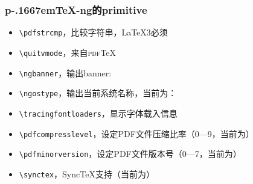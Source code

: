 \documentclass[dvipdfmx]{beamer}
\newcommand{\pTeX}{p\kern-.1667em\TeX}
\newcommand{\ptexng}{\pTeX-ng}
\begin{document}
%
\begin{frame}[fragile]
\frametitle{\ptexng 的primitive}
\begin{itemize}
\item \verb!\pdfstrcmp!，比较字符串，\LaTeX3必须
\item \verb!\quitvmode!，来自\textsc{pdf}\TeX
\item \verb!\ngbanner!，输出banner: \ngbanner
\item \verb!\ngostype!，输出当前系统名称，当前为：\ngostype
\item \verb!\tracingfontloaders!，显示字体载入信息
\item \verb!\pdfcompresslevel!，设定PDF文件压缩比率（0—9，当前为{\the\pdfcompresslevel}）
\item \verb!\pdfminorversion!，设定PDF文件版本号（0—7，当前为{\the\pdfminorversion}）
\item \verb!\synctex!，Sync\TeX 支持（当前为{\the\synctex}）
\end{itemize}
\end{frame}
%
\end{document}
